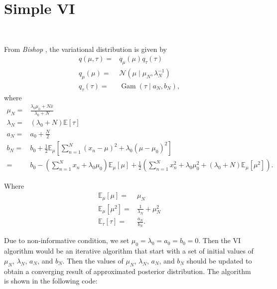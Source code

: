 \documentclass[11pt]{extarticle}
\newcommand{\N}{\mathcal{N}}
\newcommand{\0}{\mathbf{0}}
\renewcommand{\(}{\left(}
\renewcommand{\)}{\right)}
\DeclareMathOperator{\Gam}{Gam}
\theoremstyle{definition}
\begin{document}
\section{Simple VI}
\noindent{} \\
\par From \textit{Bishop} \cite{Bishop}, the variational distribution is given by
\begin{align*}
    q(\mu, \tau) =& q_{\mu}(\mu) q_{\tau}(\tau) \\
    q_{\mu}(\mu) =& \N(\mu \mid \mu_{N}, \lambda_{N}^{-1}) \\
    q_{\tau}(\tau) =& \Gam(\tau \mid a_{N}, b_{N}),
\end{align*}
where
\begin{align*}
    \mu_{N} =& \frac{\lambda_{0}\mu_{0} + N\bar{x}}{\lambda_{0} + N} \\
    \lambda_{N} =& (\lambda_{0} + N) \mathbb{E}\left[\tau\right] \\
    a_{N} =& a_{0} + \frac{N}{2} \\
    b_{N} =& b_{0} + \frac{1}{2} \mathbb{E}_{\mu}\left[\sum_{n=1}^{N}(x_{n}-\mu)^{2} + \lambda_{0}(\mu-\mu_{0})^{2}\right] \\
    =& b_{0} - \left(\sum_{n=1}^{N}x_{n} + \lambda_{0}\mu_{0}\right)\mathbb{E}_{\mu}[\mu] + \frac{1}{2}\left(\sum_{n=1}^{N}x_{n}^{2} + \lambda_{0}\mu_{0}^{2} + (\lambda_{0} + N)\mathbb{E}_{\mu}[\mu^{2}]\right).
\end{align*}
\par Where
\begin{align*}
	\mathbb{E}_{\mu}[\mu] =& \mu_{N} \\
	\mathbb{E}_{\mu}[\mu^{2}] =& \frac{1}{\lambda_{N}} + \mu_{N}^{2} \\
	\mathbb{E}_{\tau}[\tau] =& \frac{a_{N}}{b_{N}}.
\end{align*}
\par Due to non-informative condition, we set $\mu_{0} = \lambda_{0} = a_{0} = b_{0} = 0$. Then the VI algorithm would be an iterative algorithm that start with a set of initial values of $\mu_N$, $\lambda_{N}$, $a_{N}$, and $b_{N}$. Then the values of $\mu_N$, $\lambda_{N}$, $a_{N}$, and $b_{N}$ should be updated to obtain a converging result of approximated posterior distribution. The algorithm is shown in the following code:

\end{document}
